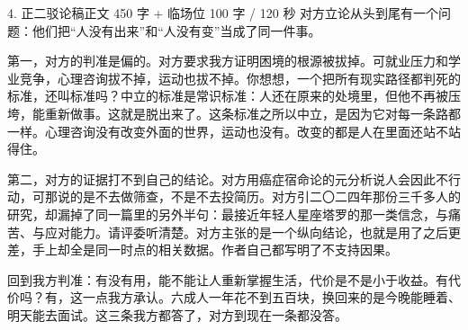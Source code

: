 \documentclass[script,pro]{debate}
\begin{document}
\begin{speech}{4. 正二驳论稿}{正文 450 字 + 临场位 100 字 / 120 秒}
对方立论从头到尾有一个问题：他们把“人没有出来”和“人没有变”当成了同一件事。

第一，对方的判准是偏的。对方要求我方证明困境的根源被拔掉。可就业压力和学业竞争，心理咨询拔不掉，运动也拔不掉。你想想，一个把所有现实路径都判死的标准，还叫标准吗？中立的标准是常识标准：人还在原来的处境里，但他不再被压垮，能重新做事。这就是脱出来了。这条标准之所以中立，是因为它对每一条路都一样。心理咨询没有改变外面的世界，运动也没有。改变的都是人在里面还站不站得住。

第二，对方的证据打不到自己的结论。对方用癌症宿命论的元分析说人会因此不行动，可那说的是不去做筛查，不是不去投简历。对方引二〇二四年那份三千多人的研究，却漏掉了同一篇里的另外半句：最接近年轻人星座塔罗的那一类信念，与痛苦、与应对能力。请评委听清楚。对方主张的是一个纵向结论，也就是用了之后更差，手上却全是同一时点的相关数据。作者自己都写明了不支持因果。

回到我方判准：有没有用，能不能让人重新掌握生活，代价是不是小于收益。有代价吗？有，这一点我方承认。六成人一年花不到五百块，换回来的是今晚能睡着、明天能去面试。这三条我方都答了，对方到现在一条都没答。

\begin{contingency}
\end{contingency}
\end{speech}
\end{document}
